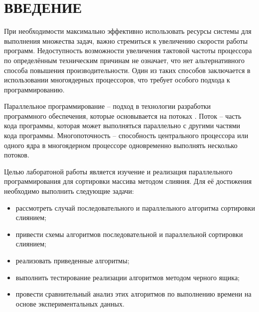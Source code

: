 \part*{ВВЕДЕНИЕ}

При необходимости максимально эффективно использовать ресурсы системы для выполнения множества задач, важно стремиться к увеличению скорости работы программ. Недоступность возможности увеличения тактовой частоты процессора по определённым техническим причинам не означает, что нет альтернативного способа повышения производительности. Один из таких способов заключается в использовании многоядерных процессоров, что требует особого подхода к программированию.

Параллельное программирование --  подход в технологии разработки программного обеспечения, которые основывается на потоках \cite{parallel}. Поток -- часть кода программы, которая может выполняться параллельно с другими частями кода программы. Многопоточность -- способность центрального процессора или одного ядра в многоядерном процессоре одновременно выполнять несколько потоков.

Целью лаборатоной работы является изучение и реализация параллельного программирования для сортировки массива методом слияния. Для её достижения необходимо выполнить следующие задачи:
\begin{itemize}
	\item рассмотреть случай последовательного и параллельного алгоритма сортировки слиянием;
	\item привести схемы алгоритмов последовательной и параллельной сортировки слиянием;
	\item реализовать приведенные алгоритмы;
	\item выполнить тестирование реализации алгоритмов методом черного ящика;
	\item провести сравнительный анализ этих алгоритмов по выполнению времени на основе экспериментальных данных.
\end{itemize}